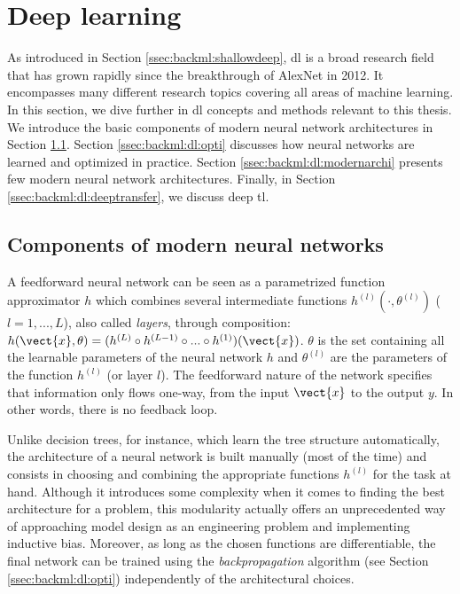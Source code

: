 \section{Deep learning}
\label{sec:backml:deeplearning}

As introduced in Section \ref{ssec:backml:shallowdeep}, \acrlong{dl} is a broad
research field that has grown rapidly since the breakthrough of AlexNet in 2012.
It encompasses many different research topics covering all areas of machine
learning. In this section, we dive further in \acrlong{dl} concepts and
methods relevant to this thesis. We introduce the basic components of modern neural
network architectures in Section \ref{ssec:backml:dp:components}. Section
\ref{ssec:backml:dl:opti} discusses how neural networks are learned and optimized
in practice. Section \ref{ssec:backml:dl:modernarchi} presents few modern neural
network architectures. Finally, in Section \ref{ssec:backml:dl:deeptransfer}, we
discuss deep \acrlong{tl}.

\subsection{Components of modern neural networks}
\label{ssec:backml:dp:components}

A feedforward neural network can be seen as a parametrized function approximator
$h$ which combines several intermediate functions $h^{(l)}(\cdot, \theta^{(l)})$
($l=1, ..., L$), also called \textit{layers}, through composition:
$h(\vect{x}, \theta) = (h^{(L)} \circ h^{(L-1)} \circ ... \circ h^{(1)})(\vect{x})$.
$\theta$ is the set containing all the learnable parameters of the neural network
$h$ and $\theta^{(l)}$ are the parameters of the function $h^{(l)}$ (or layer
$l$). The feedforward nature of the network specifies that information only flows
one-way, from the input $\vect{x}$ to the output $y$. In other words, there is no
feedback loop.

Unlike decision trees, for instance, which learn the tree structure automatically,
the architecture of a neural network is built manually (most of the time) and
consists in choosing and combining the appropriate functions $h^{(l)}$ for the
task at hand. Although it introduces some complexity when it comes to finding the
best architecture for a problem, this modularity actually offers an unprecedented
way of approaching model design as an engineering problem and implementing inductive
bias. Moreover, as long as the chosen functions are differentiable, the final
network can be trained using the \textit{backpropagation} algorithm (see Section
\ref{ssec:backml:dl:opti}) independently of the architectural choices.

